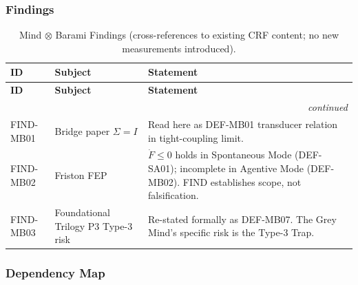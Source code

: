 \documentclass[12pt, a4paper]{article}
\begin{document}
\subsubsection{Findings}

{\small
\renewcommand{\arraystretch}{1.30}
\begin{longtable}{@{}p{1.5cm} p{4.0cm} p{7.0cm}@{}}
\caption{Mind $\otimes$ Barami Findings (cross-references to existing CRF
content; no new measurements introduced).}\\
\toprule
\textbf{ID} & \textbf{Subject} & \textbf{Statement} \\
\midrule
\endfirsthead
\toprule
\textbf{ID} & \textbf{Subject} & \textbf{Statement} \\
\midrule
\endhead
\midrule \multicolumn{3}{r}{\emph{continued}}\\ \endfoot
\bottomrule \endlastfoot
FIND-MB01 & Bridge paper $\Sigma = I$ & Read here as DEF-MB01 transducer relation in tight-coupling limit. \\
FIND-MB02 & Friston FEP & $\dot F \le 0$ holds in Spontaneous Mode (DEF-SA01); incomplete in Agentive Mode (DEF-MB02). FIND establishes scope, not falsification. \\
FIND-MB03 & Foundational Trilogy P3 Type-3 risk & Re-stated formally as DEF-MB07. The Grey Mind's specific risk is the Type-3 Trap. \\
\end{longtable}
}

\subsubsection{Dependency Map}
\end{document}
